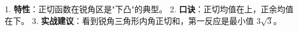 \begin{summarybox}
1. \textbf{特性}：正切函数在锐角区是"下凸"的典型。
2. \textbf{口诀}：正切均值在上，正余均值在下。
3. \textbf{实战建议}：看到锐角三角形内角正切和，第一反应是最小值 $3\sqrt{3}$。
\end{summarybox}